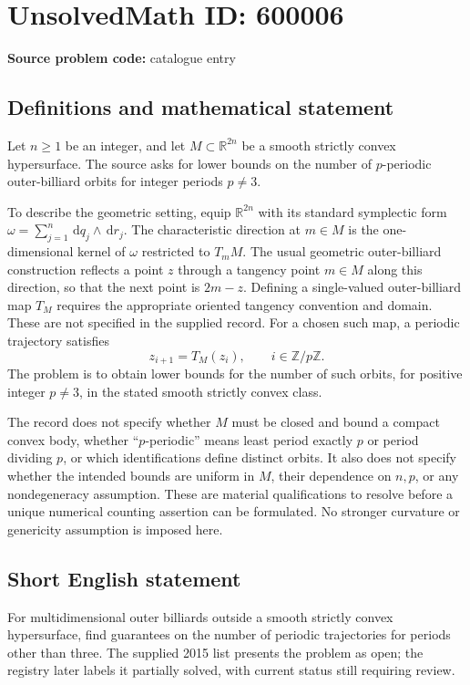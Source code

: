 \documentclass[11pt]{article}
\newcommand{\Z}{\mathbb{Z}}
\newcommand{\R}{\mathbb{R}}
\newcommand{\dd}{\,\mathrm{d}}
\begin{document}
\section*{UnsolvedMath ID: 600006}
\textbf{Source problem code:} catalogue entry
\subsection{Definitions and mathematical statement}
Let $n\geq1$ be an integer, and let $M\subset\R^{2n}$ be a smooth strictly convex hypersurface. The source asks for lower bounds on the number of $p$-periodic outer-billiard orbits for integer periods $p\ne3$.

To describe the geometric setting, equip $\R^{2n}$ with its standard symplectic form $\omega=\sum_{j=1}^{n}\dd q_j\wedge\dd r_j$. The characteristic direction at $m\in M$ is the one-dimensional kernel of $\omega$ restricted to $T_mM$. The usual geometric outer-billiard construction reflects a point $z$ through a tangency point $m\in M$ along this direction, so that the next point is $2m-z$. Defining a single-valued outer-billiard map $T_M$ requires the appropriate oriented tangency convention and domain. These are not specified in the supplied record. For a chosen such map, a periodic trajectory satisfies
\[
 z_{i+1}=T_M(z_i),\qquad i\in\Z/p\Z.
\]
The problem is to obtain lower bounds for the number of such orbits, for positive integer $p\ne3$, in the stated smooth strictly convex class.

The record does not specify whether $M$ must be closed and bound a compact convex body, whether ``$p$-periodic'' means least period exactly $p$ or period dividing $p$, or which identifications define distinct orbits. It also does not specify whether the intended bounds are uniform in $M$, their dependence on $n,p$, or any nondegeneracy assumption. These are material qualifications to resolve before a unique numerical counting assertion can be formulated. No stronger curvature or genericity assumption is imposed here.
\subsection{Short English statement}
For multidimensional outer billiards outside a smooth strictly convex hypersurface, find guarantees on the number of periodic trajectories for periods other than three. The supplied 2015 list presents the problem as open; the registry later labels it partially solved, with current status still requiring review.
\end{document}
